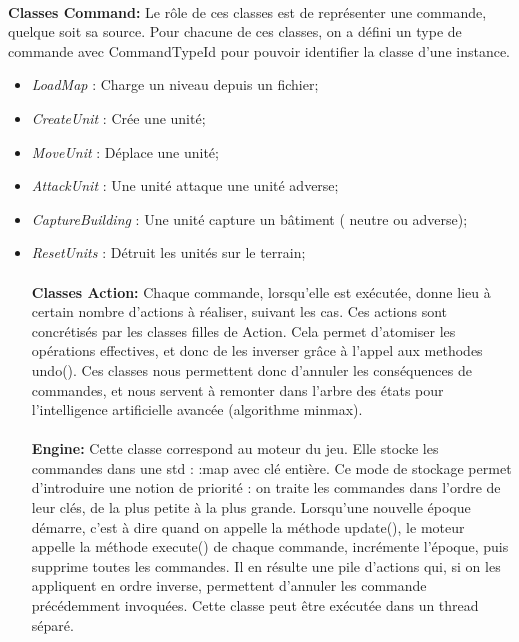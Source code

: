 \documentclass[12pt]{report}
\begin{document}
\paragraph{}\textbf{Classes Command:} Le rôle de ces classes est de représenter une commande, quelque soit sa source. Pour chacune de ces classes, on a défini un type de commande avec CommandTypeId pour pouvoir identifier la classe d'une instance.
\begin{itemize}
    \item \emph{LoadMap} : Charge un niveau depuis un fichier;
    \item \emph{CreateUnit} : Crée une unité;
    \item \emph{MoveUnit} : Déplace une unité;
    \item \emph{AttackUnit} : Une unité attaque une unité adverse;
    \item \emph{CaptureBuilding} : Une unité capture un bâtiment ( neutre ou adverse);
    \item \emph{ResetUnits} : Détruit les unités sur le terrain;
    
\paragraph{}\textbf{Classes Action:}  Chaque commande, lorsqu’elle est exécutée, donne lieu à certain nombre d’actions à réaliser, suivant les cas. Ces actions sont concrétisés par les classes ﬁlles de Action. Cela permet d’atomiser les opérations effectives, et donc de les inverser grâce à l’appel aux methodes undo(). Ces classes nous permettent donc d’annuler les conséquences de commandes, et nous servent à remonter dans l’arbre des états pour l’intelligence artiﬁcielle avancée (algorithme minmax). 

\paragraph{}\textbf{Engine:} Cette classe correspond au moteur du jeu. Elle stocke les commandes dans une std : :map avec clé entière. Ce mode de stockage permet d’introduire une notion de priorité : on traite les commandes dans l’ordre de leur clés, de la plus petite à la plus grande. Lorsqu’une nouvelle époque démarre, c'est à dire quand on appelle la méthode update(), le moteur appelle la méthode execute() de chaque commande, incrémente l’époque, puis supprime toutes les commandes. Il en résulte une pile d’actions qui, si on les appliquent en ordre inverse, permettent d’annuler les commande précédemment invoquées. Cette classe peut être exécutée dans un thread séparé.



\end{itemize}
\end{document}
